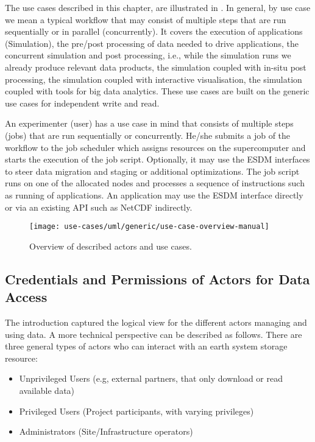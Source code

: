 \medskip

The use cases described in this chapter, are illustrated in .
In general, by use case we mean a typical workflow that may consist of multiple steps that are run sequentially or in parallel (concurrently).
It covers the execution of applications (Simulation),
the pre/post processing of data needed to drive applications,
the concurrent simulation and post processing, i.e., while the simulation runs we already produce relevant data products,
the simulation coupled with in-situ post processing,
the simulation coupled with interactive visualisation,
the simulation coupled with tools for big data analytics.
These use cases are built on the generic use cases for independent write and read.


An experimenter (user) has a use case in mind that consists of multiple steps (jobs) that are run sequentially or concurrently.
He/she submits a job of the workflow to the job scheduler which assigns resources on the supercomputer and starts the execution of the job script.
Optionally, it may use the ESDM interfaces to steer data migration and staging or additional optimizations.
The job script runs on one of the allocated nodes and processes a sequence of instructions such as running of applications.
An application may use the ESDM interface directly or via an existing API such as NetCDF indirectly.




\begin{figure}
	\centering
	\texttt{[image: use-cases/uml/generic/use-case-overview-manual]}
	\caption{Overview of described actors and use cases.}
	\label{fig:overview-actors-use-cases}
\end{figure}





\subsection{Credentials and Permissions of Actors for Data Access}

The introduction captured the logical view for the different actors managing and using data.
A more technical perspective can be described as follows.
There are three general types of actors who can interact with an earth system storage resource:

\begin{itemize}
	\item Unprivileged Users (e.g, external partners, that only download or read available data)
	\item Privileged Users (Project participants, with varying privileges)
	\item Administrators (Site/Infrastructure operators)
\end{itemize}

